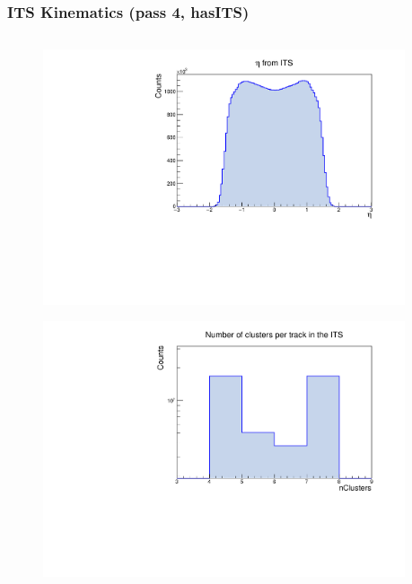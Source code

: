 \documentclass[10pt]{beamer}
\begin{document}
\begin{frame}
    \frametitle{ITS Kinematics (pass 4, hasITS)}

    \begin{columns}
        \begin{column}{0.5\textwidth}
            \vspace*{-0.43cm}
            \begin{figure}
                \begin{center}
                    \includegraphics[width=0.95\textwidth]{Plots/pass4_TracksIU/eta.pdf}
                \end{center}
            \end{figure}
            \vspace*{-0.6cm}
            \begin{figure}
                \begin{center}
                    \includegraphics[width=0.95\textwidth]{Plots/pass4_TracksIU/itsNCls.pdf}

\end{center}
\end{figure}
\end{column}
\end{columns}
\end{frame}
\end{document}
